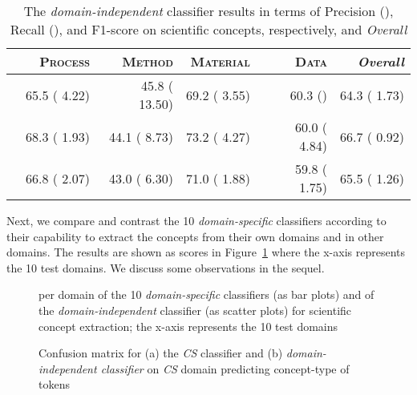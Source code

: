 \documentclass[runningheads]{llncs}
\begin{document}
\begin{table}[htb]
\small
\caption{The \textit{domain-independent} classifier results in terms of Precision (), Recall (), and F1-score on scientific concepts, respectively, and \textit{Overall}}
\begin{tabular}{p{3.5mm}|rrrr|r}
            & \multicolumn{1}{p{20mm}}{\textsc{Process}} & \multicolumn{1}{p{20mm}}{\textsc{Method}} & \multicolumn{1}{p{20mm}}{\textsc{Material}} & \multicolumn{1}{p{20mm}}{\textsc{Data}}
            & \multicolumn{1}{p{20mm}}{\textit{Overall}} \\ \hline
  & 65.5 ( 4.22)   & 45.8 ( 13.50)    & 69.2 ( 3.55)      & 60.3 ()      & 64.3 ( 1.73)   \\
  & 68.3 ( 1.93)  & 44.1 ( 8.73)   & 73.2 ( 4.27)     & 60.0 ( 4.84)    & 66.7  ( 0.92)    \\
 & 66.8  ( 2.07)  & 43.0 ( 6.30)  & 71.0 ( 1.88)      & 59.8 ( 1.75)      & 65.5 ( 1.26)      
\end{tabular}
\label{table:4}
\end{table}

Next, we compare and contrast the 10 \textit{domain-specific}
classifiers according to their capability to extract the concepts from their own domains and in other domains.
The results are shown as  scores in Figure~\ref{fig:2} where the x-axis represents the 10 test domains. We discuss some observations in the sequel.

\begin{figure}[htb]
    \caption{ per domain of the 10 \textit{domain-specific} classifiers (as bar plots) and of the \textit{domain-independent} classifier (as scatter plots) for scientific concept extraction; the x-axis represents the 10 test domains}
    \label{fig:2}
\end{figure}

\begin{figure}[!htb]
    \centering
    \qquad
        
    \caption{Confusion matrix for (a) the \textit{CS} classifier and (b) \textit{domain-independent classifier} on \textit{CS} domain predicting concept-type of tokens}
    \label{fig:cm}
\end{figure}
\end{document}
